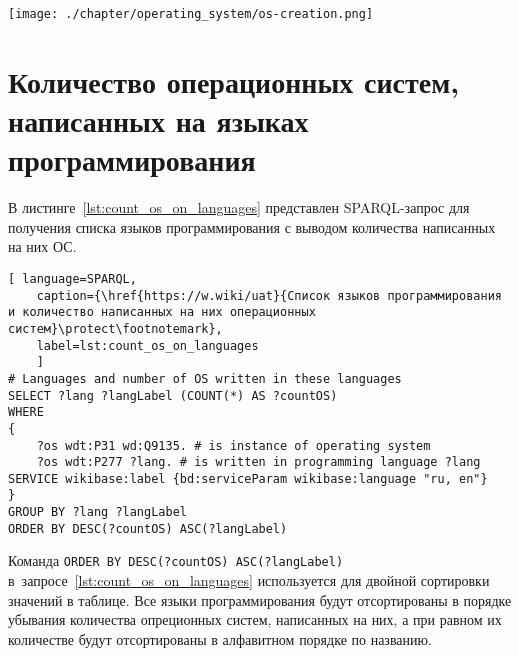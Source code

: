 \begin{figure*}[h!]
	\texttt{[image: ./chapter/operating\_system/os-creation.png]}
    \caption[Часть временной шкалы с датами выпуска ОС.]{Часть временной шкалы с датами выпуска операционных систем с~1955 по~2020 год. Шкала построена по запросу~\protect\ref{lst:inception_time_of_operating_systems}.}
	\label{fig:os_creation}
\end{figure*}



\section{Количество операционных систем, написанных на языках программирования}

В листинге~\ref{lst:count_os_on_languages} представлен SPARQL-запрос для получения списка языков программирования с выводом количества написанных на них ОС.


\marginnote[0.0cm]{
    \newline
    \newline
    \newline
    \newline
}
\begin{lstlisting}[ language=SPARQL, 
	caption={\href{https://w.wiki/uat}{Список языков программирования и количество написанных на них операционных систем}\protect\footnotemark},
	label=lst:count_os_on_languages
	]
# Languages and number of OS written in these languages
SELECT ?lang ?langLabel (COUNT(*) AS ?countOS)
WHERE 
{
	?os wdt:P31 wd:Q9135. # is instance of operating system
	?os wdt:P277 ?lang. # is written in programming language ?lang
SERVICE wikibase:label {bd:serviceParam wikibase:language "ru, en"}
}
GROUP BY ?lang ?langLabel
ORDER BY DESC(?countOS) ASC(?langLabel)
\end{lstlisting}

Команда \lstinline|ORDER BY DESC(?countOS) ASC(?langLabel)| в~запросе~\ref{lst:count_os_on_languages} используется для двойной сортировки значений в таблице. Все языки программирования будут отсортированы в порядке убывания количества опреционных систем, написанных на них, а при равном их количестве будут отсортированы в алфавитном порядке по названию.

